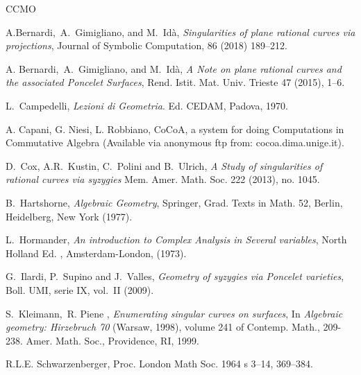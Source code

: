 \documentclass[draft]{amsart}
\theoremstyle{definition}
\theoremstyle{remark}
\theoremstyle{definition}
\begin{document}
\begin{thebibliography}{CCMO}

 A.Bernardi,\  A.\ Gimigliano, and M.\ Id\`a,
{\it Singularities of plane rational curves via projections},
 Journal of Symbolic Computation, 86 (2018) 189--212.

 A. Bernardi,\ A.\ Gimigliano, and M.\ Id\`a,
{\it A Note on plane rational curves and the associated Poncelet Surfaces},
Rend. Istit. Mat. Univ. Trieste 47 (2015), 1--6.

 L.\ Campedelli, {\it Lezioni di Geometria}. Ed. CEDAM, Padova, 1970.

 A. Capani, G. Niesi, L. Robbiano, CoCoA, a system for doing Computations in
Commutative Algebra (Available via anonymous ftp from: cocoa.dima.unige.it).

 D.\ Cox, A.R.\ Kustin, C.\ Polini and B.\ Ulrich,
{\it A Study of singularities of rational curves via syzygies}
Mem. Amer. Math. Soc. 222 (2013), no. 1045.

  B.\ Hartshorne, {\it Algebraic Geometry}, Springer, Grad. Texts in Math. 52, Berlin, Heidelberg, New York (1977).


 L.\ Hormander, {\it An introduction to Complex Analysis in Several variables}, North Holland Ed. , Amsterdam-London, (1973).

 G.\ Ilardi, P.\ Supino and J.\ Valles, {\it Geometry of syzygies via Poncelet varieties},
Boll. UMI, serie IX, vol.\ II (2009).


 S.\ Kleimann,\ R. Piene , {\it Enumerating singular curves on surfaces}, In {\it Algebraic geometry: Hirzebruch 70} (Warsaw, 1998), volume 241 of Contemp. Math.,  209-238. Amer. Math. Soc., Providence, RI, 1999.

 R.L.E. Schwarzenberger, Proc. London Math Soc. 1964 s 3--14, 369--384.


\end{thebibliography}
\end{document}
